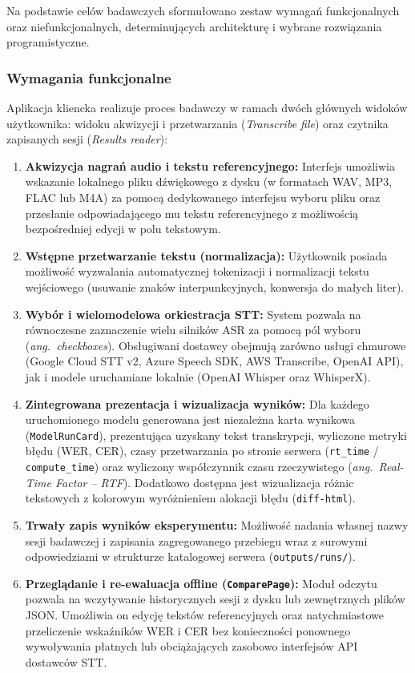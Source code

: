Na podstawie celów badawczych sformułowano zestaw wymagań funkcjonalnych oraz niefunkcjonalnych, determinujących architekturę i wybrane rozwiązania programistyczne.

\subsubsection{Wymagania funkcjonalne}

Aplikacja kliencka realizuje proces badawczy w ramach dwóch głównych widoków użytkownika: widoku akwizycji i przetwarzania (\textit{Transcribe file}) oraz czytnika zapisanych sesji (\textit{Results reader}):
\begin{enumerate}
    \item \textbf{Akwizycja nagrań audio i tekstu referencyjnego:} Interfejs umożliwia wskazanie lokalnego pliku dźwiękowego z dysku (w formatach WAV, MP3, FLAC lub M4A) za pomocą dedykowanego interfejsu wyboru pliku oraz przesłanie odpowiadającego mu tekstu referencyjnego z możliwością bezpośredniej edycji w polu tekstowym.
    \item \textbf{Wstępne przetwarzanie tekstu (normalizacja):} Użytkownik posiada możliwość wyzwalania automatycznej tokenizacji i normalizacji tekstu wejściowego (usuwanie znaków interpunkcyjnych, konwersja do małych liter).
    \item \textbf{Wybór i wielomodelowa orkiestracja STT:} System pozwala na równoczesne zaznaczenie wielu silników ASR za pomocą pól wyboru (\textit{ang.~checkboxes}). Obsługiwani dostawcy obejmują zarówno usługi chmurowe (Google Cloud STT v2, Azure Speech SDK, AWS Transcribe, OpenAI API), jak i modele uruchamiane lokalnie (OpenAI Whisper oraz WhisperX).
    \item \textbf{Zintegrowana prezentacja i wizualizacja wyników:} Dla każdego uruchomionego modelu generowana jest niezależna karta wynikowa (\texttt{ModelRunCard}), prezentująca uzyskany tekst transkrypcji, wyliczone metryki błędu (WER, CER), czasy przetwarzania po stronie serwera (\texttt{rt\_time} / \texttt{compute\_time}) oraz wyliczony współczynnik czasu rzeczywistego (\textit{ang.~Real-Time Factor -- RTF}). Dodatkowo dostępna jest wizualizacja różnic tekstowych z kolorowym wyróżnieniem alokacji błędu (\texttt{diff-html}).
    \item \textbf{Trwały zapis wyników eksperymentu:} Możliwość nadania własnej nazwy sesji badawczej i zapisania zagregowanego przebiegu wraz z surowymi odpowiedziami w strukturze katalogowej serwera (\texttt{outputs/runs/}).
    \item \textbf{Przeglądanie i re-ewaluacja offline (\texttt{ComparePage}):} Moduł odczytu pozwala na wczytywanie historycznych sesji z dysku lub zewnętrznych plików JSON. Umożliwia on edycję tekstów referencyjnych oraz natychmiastowe przeliczenie wskaźników WER i CER bez konieczności ponownego wywoływania płatnych lub obciążających zasobowo interfejsów API dostawców STT.
\end{enumerate}

